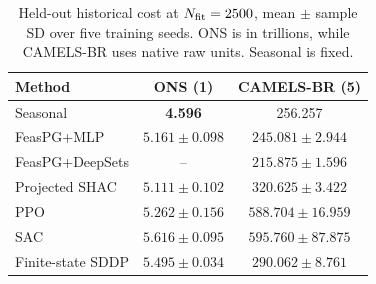 \begin{table}[!htbp]
\caption{Held-out historical cost at \(N_{\rm fit}=2500\), mean \(\pm\) sample SD
over five training seeds. ONS is in trillions, while CAMELS-BR uses native raw
units. Seasonal is fixed.}
\label{tab:real-history-full}
\centering
\scriptsize
\setlength{\tabcolsep}{2.5pt}
\begin{tabular}{@{}lcc@{}}
\toprule
Method & ONS (1) & CAMELS-BR (5)\\
\midrule
Seasonal & \textbf{4.596} & 256.257\\
FeasPG+MLP & $5.161\pm0.098$ & $245.081\pm2.944$\\
FeasPG+DeepSets & -- & {\boldmath $215.875\pm1.596$}\\
Projected SHAC & $5.111\pm0.102$ & $320.625\pm3.422$\\
PPO & $5.262\pm0.156$ & $588.704\pm16.959$\\
SAC & $5.616\pm0.095$ & $595.760\pm87.875$\\
Finite-state SDDP & $5.495\pm0.034$ & $290.062\pm8.761$\\
\bottomrule
\end{tabular}
\end{table}
